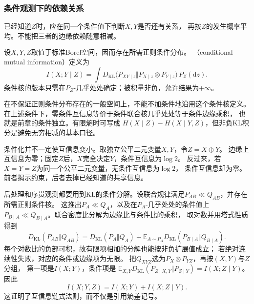 \subsubsection{条件观测下的依赖关系}
\label{sec:information-conditional-mi}

已经知道\(Z\)时，应在同一个条件值下判断\(X,Y\)是否还有关系，
再按\(Z\)的发生概率平均。不能把三者的边缘依赖随意相减。

\begin{definition}[条件互信息]
\label{def:information-conditional-mi}
设\(X,Y,Z\)取值于标准Borel空间，因而存在所需正则条件分布。
（conditional mutual information）定义为
\begin{equation}
  I(X;Y\mid Z)
  =\int D_{\mathrm{KL}}\bigl(
    P_{XY\mid z}\Vert P_{X\mid z}\otimes P_{Y\mid z}\bigr)\,P_Z(\mathrm dz).
  \label{eq:information-conditional-mutual-information}
\end{equation}
条件核的版本只需在\(P_Z\)-几乎处处确定；被积量非负，允许结果为\(+\infty\)。
\end{definition}

在不保证正则条件分布存在的一般空间上，不能不加条件地沿用这个条件核定义。
在上述条件下，零条件互信息等价于条件联合核几乎处处等于条件边缘乘积，
也就是前章的条件独立。有限熵时可写成
\(H(X\mid Z)-H(X\mid Y,Z)\)，但非负KL积分是避免无穷相减的基本口径。

条件化并不一定使互信息变小。取独立公平二元变量\(X,Y\)，令\(Z=X\oplus Y\)。
边缘上互信息为零；固定\(Z\)后，\(X\)完全决定\(Y\)，条件互信息为\(\log2\)。
反过来，若\(X=Y=Z\)为同一个公平二元变量，无条件互信息为\(\log2\)，
条件互信息却为零。前者揭示约束，后者去掉已经知道的共享信息。

后处理和序贯观测都要用到KL的条件分解。设联合规律满足\(P_{AB}\ll Q_{AB}\)，并存在所需正则条件核。
这推出\(P_A\ll Q_A\)，以及在\(P_A\)-几乎处处的条件值上
\(P_{B\mid A}\ll Q_{B\mid A}\)。联合密度比分解为边缘比与条件比的乘积，
取对数并用塔式性质得到
\begin{equation}
  D_{\mathrm{KL}}(P_{AB}\Vert Q_{AB})
  =D_{\mathrm{KL}}(P_A\Vert Q_A)
   +\mathbb E_{A\sim P_A}
       D_{\mathrm{KL}}(P_{B\mid A}\Vert Q_{B\mid A}).
  \label{eq:information-kl-conditional-chain}
\end{equation}
每个对数比的负部可积，故有限项相加的分解也能按非负扩展值成立；
若绝对连续性失败，对应的条件或边缘项为无限。
把\(Q_{XYZ}\)选为\(P_X\otimes P_{YZ}\)，再按\((X,Y)\)与\(Z\)分组，
第一项是\(I(X;Y)\)，条件项是
\(\mathbb E_{X,Y}D_{\mathrm{KL}}(P_{Z\mid X,Y}\Vert P_{Z\mid Y})
=I(X;Z\mid Y)\)。因此
\[
  I(X;Y,Z)=I(X;Y)+I(X;Z\mid Y).
\]
这证明了互信息链式法则，而不仅是引用熵差记号。

